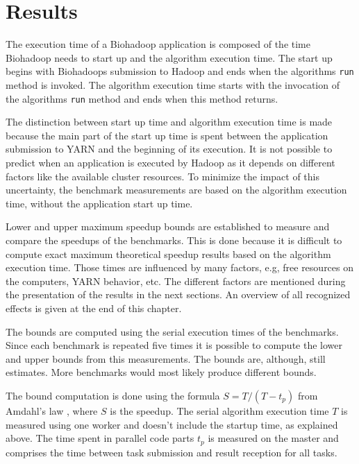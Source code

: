 \section{Results}
\label{chap:evaluation:result}
The execution time of a Biohadoop application is composed of the time Biohadoop needs to start up and the algorithm execution time. The start up begins with Biohadoops submission to Hadoop and ends when the algorithms \texttt{run} method is invoked. The algorithm execution time starts with the invocation of the algorithms \texttt{run} method and ends when this method returns.

The distinction between start up time and algorithm execution time is made because the main part of the start up time is spent between the application submission to YARN and the beginning of its execution. It is not possible to predict when an application is executed by Hadoop as it depends on different factors like the available cluster resources. To minimize the impact of this uncertainty, the benchmark measurements are based on the algorithm execution time, without the application start up time.

Lower and upper maximum speedup bounds are established to measure and compare the speedups of the benchmarks. This is done because it is difficult to compute exact maximum theoretical speedup results based on the algorithm execution time. Those times are influenced by many factors, e.g, free resources on the computers, YARN behavior, etc. The different factors are mentioned during the presentation of the results in the next sections. An overview of all recognized effects is given at the end of this chapter.

The bounds are computed using the serial execution times of the benchmarks. Since each benchmark is repeated five times it is possible to compute the lower and upper bounds from this measurements. The bounds are, although, still estimates. More benchmarks would most likely produce different bounds.

The bound computation is done using the formula $S = T / (T - t_p)$ from Amdahl's law \cite{amdahl1967validity}, where $S$ is the speedup. The serial algorithm execution time $T$ is measured using one worker and doesn't include the startup time, as explained above. The time spent in parallel code parts $t_p$ is measured on the master and comprises the time between task submission and result reception for all tasks.

